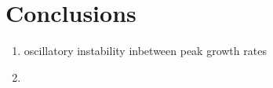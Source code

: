 \chapter{Conclusions}

\begin{enumerate}
\item oscillatory instability inbetween peak growth rates
\item 
\end{enumerate}



